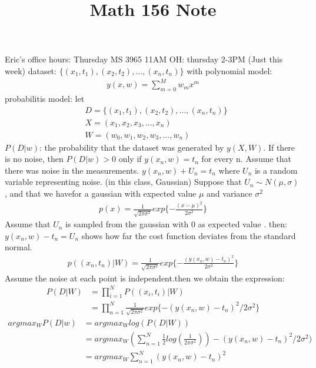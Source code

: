 \documentclass[11pt]{article}
\theoremstyle{plain}
\theoremstyle{definition}
\begin{document}
 
\title{Math 156 Note}
\maketitle

Eric's office hours: Thursday MS 3965 11AM 
OH: thursday 2-3PM (Just this week) 
dataset: $\{ (x_1,t_1), (x_2, t_2), ..., (x_n, t_n)\}$ with polynomial model: \begin{align*}
y(x,w) = \sum\limits_{m=0}^{M} w_m x^m
\end{align*} 
probabilitis model: 
let \begin{align*}
&D = \{ (x_1,t_1), (x_2, t_2), ..., (x_n, t_n)\}\\
&X = (x_1, x_2, x_3, ... , x_n) \\
&W = (w_0, w_1, w_2, w_3, ... , w_n) 
\end{align*}
$ P(D|w)$: the probability that the dataset was generated by $y(X,W)$.
If there is no noise, then $P(D|w) > 0$ only if $y(x_n, w) = t_n$ for every n. 
Assume that there was noise in the measurements. $y(x_n, w) + U_n = t_n$
where $U_n$ is a random variable representing noise. (in this class, Gaussian)
Suppose that $U_n\sim N(\mu, \sigma)$, and that we havefor a gaussian with expected value $\mu$ and variance $\sigma^2$ \begin{align*}
p(x) = \frac{1}{\sqrt{2\pi \sigma^2}} exp\{ -\frac{(x-\mu)^2}{2\sigma^2}   \}
\end{align*}
Assume that $U_n$ is sampled from the gaussian with 0 as expected value . 
then: $y(x_n, w) - t_n = U_n $ shows how far the cost function deviates from the standard normal. 
\begin{align*}
p((x_n, t_n) | W) =  \frac{1}{\sqrt{2\pi \sigma^2}} exp\{ -\frac{(y(x_n, w) -t_n)^2}{2\sigma^2} \}
\end{align*}
Assume the noise at each point is independent.then we obtain the expression:\begin{align*} 
P(D|W) &= \prod_{i=1}^{N} P((x_i,t_i)|W)\\
	   &= \prod_{n=1}^{N} \frac{1}{\sqrt{2\pi\sigma^2}} exp \{ -(y(x_n,w) - t_n)^2/2\sigma^2\}
\end{align*}
\begin{align*}
argmax_{W} P(D|w) &= argmax_{W} log(P(D|W)) \\
				  &= argmax_W(\sum\limits_{n=1}^{N} \frac{1}{2}log(\frac{1}{2\pi\sigma^2})) -(y(x_n,w) - t_n)^2/2\sigma^2) \\
				  &= argmax_W \sum\limits_{n=1}^{N} (y(x_n, w)-t_n)^2
\end{align*}
\end{document}
